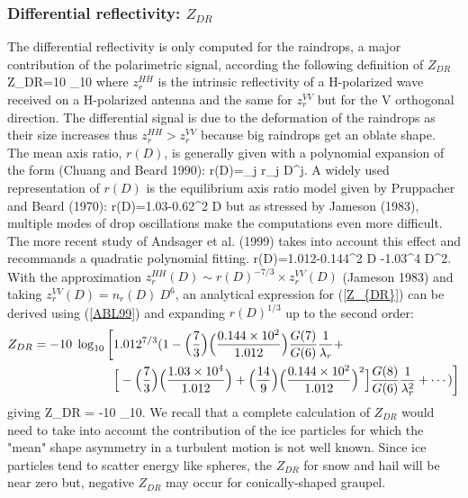 %
\subsubsection{Differential reflectivity: $Z_{DR}$}
%
The differential reflectivity is only computed for the raindrops, a major
contribution of the polarimetric signal, according the following definition of 
$Z_{DR}$
%
\beq\label{Z_{DR}}
Z_{DR}=10\; \log_{10}
\eeq
%
\noindent where $z^{HH}_r$ is the intrinsic reflectivity of a H-polarized wave 
received on a H-polarized antenna and the same for $z^{VV}_r$ but for 
the V orthogonal direction. The differential signal is due to the deformation 
of the raindrops as their size increases thus $z^{HH}_r>z^{VV}_r$ because big
raindrops get an oblate shape. The mean axis ratio, $r(D)$, is generally given 
with a polynomial expansion of the form (Chuang and Beard 1990):
%
\beq\label{axis}
r(D)=\sum_j r_j D^j.
\eeq
%
A widely used representation of $r(D)$ is the equilibrium axis ratio model
given by Pruppacher and Beard (1970):
%
\beq\label{PB70}
r(D)=1.03-0.62^{2} \times D
\eeq
%
\noindent but as stressed by Jameson (1983), multiple modes of drop oscillations
make the computations even more difficult. The more recent study of 
Andsager et al. (1999) takes into account this effect and recommands a 
quadratic polynomial fitting.
%
\beq\label{ABL99}
r(D)=1.012-0.144^{2} \times D -1.03^{4} \times D^2.
\eeq
%
With the approximation $z^{HH}_r(D) \sim r(D)^{-7/3} \times z^{VV}_r(D)$ 
(Jameson 1983) and taking $z^{VV}_r(D)=n_r(D)\ D^6$, an analytical expression 
for (\ref{Z_{DR}}) can be derived using (\ref{ABL99}) and expanding 
$r(D)^{1/3}$ up to the second order:
%
\begin{eqnarray}
Z_{DR} = -10\; \log_{10}\bigg[ &
1.012^{7/3}(1-\Big(\frac{7}{3}\Big)\Big(\frac{0.144 \times 10^{2}}{1.012}\Big)\frac{G(7)}{G(6)}\frac{1}{\lambda_r}+ \notag \\
& \Big[-\Big(\frac{7}{3}\Big)\Big(\frac{1.03 \times 10^{4}}{1.012}\Big)+\Big(\frac{14}{9}\Big)\Big(\frac{0.144 \times 10^{2}}{1.012}\Big)^2\Big]\frac{G(8)}{G(6)}\frac{1}{\lambda_r^2}+\dotsb)\bigg]
\end{eqnarray}
%
giving
%
\beq\label{approxZABL_{DR}}
Z_{DR} = -10\; \log_{10}.
\eeq
%
We recall that a complete calculation of 
$Z_{DR}$ would need to take into account the contribution of the ice particles
for which the "mean" shape asymmetry in a turbulent motion is not well known.
Since ice particles tend to scatter energy like spheres, the $Z_{DR}$ for snow
and hail will be near zero but, negative $Z_{DR}$ may occur for 
conically-shaped graupel.

